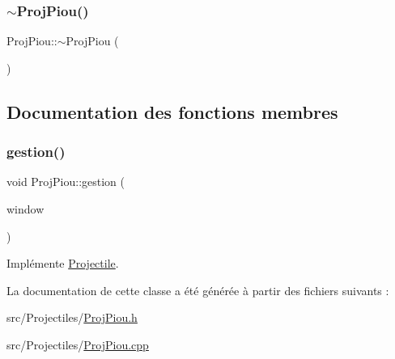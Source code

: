 \mbox{\label{class_proj_piou_a02224f153ad53afc2b1c40b986ec6492}} 
\subsubsection{\texorpdfstring{$\sim$\+Proj\+Piou()}{~ProjPiou()}}
{\footnotesize\ttfamily Proj\+Piou\+::$\sim$\+Proj\+Piou (\begin{DoxyParamCaption}{ }\end{DoxyParamCaption})}



\subsection{Documentation des fonctions membres}
\mbox{\label{class_proj_piou_a964182d333ed2bf64408a7812bc4cd28}} 
\subsubsection{\texorpdfstring{gestion()}{gestion()}}
{\footnotesize\ttfamily void Proj\+Piou\+::gestion (\begin{DoxyParamCaption}\item[{sf\+::\+Render\+Window \&}]{window }\end{DoxyParamCaption})\hspace{0.3cm}{\ttfamily [virtual]}}



Implémente \hyperlink{class_projectile_aa969857f9837d9be3a6ea415c9ba3ff1}{Projectile}.



La documentation de cette classe a été générée à partir des fichiers suivants \+:\begin{DoxyCompactItemize}
\item 
src/\+Projectiles/\hyperlink{_proj_piou_8h}{Proj\+Piou.\+h}\item 
src/\+Projectiles/\hyperlink{_proj_piou_8cpp}{Proj\+Piou.\+cpp}\end{DoxyCompactItemize}
